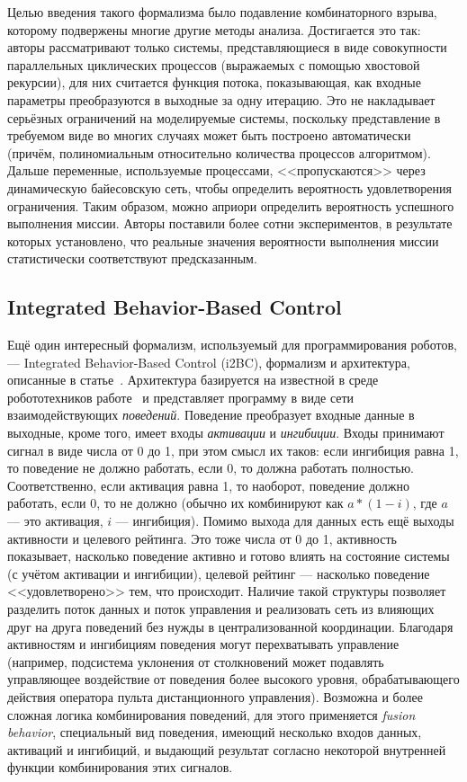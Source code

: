 \documentclass[conference]{IEEEtran}
\begin{document}
Целью введения такого формализма было подавление комбинаторного взрыва, которому 
подвержены многие другие методы анализа. Достигается это так: авторы рассматривают только системы, 
представляющиеся в виде совокупности параллельных циклических процессов 
(выражаемых с помощью хвостовой рекурсии), для них считается функция потока, 
показывающая, как входные параметры преобразуются в выходные за одну итерацию. 
Это не накладывает серьёзных ограничений на моделируемые системы, поскольку 
представление в требуемом виде во многих случаях может быть построено 
автоматически (причём, полиномиальным относительно количества процессов 
алгоритмом). Дальше переменные, используемые процессами, <<пропускаются>> 
через динамическую байесовскую сеть, чтобы определить вероятность удовлетворения 
ограничения. Таким образом, можно априори определить вероятность успешного 
выполнения миссии. Авторы поставили более сотни экспериментов, в результате 
которых установлено, что реальные значения вероятности выполнения миссии 
статистически соответствуют предсказанным.

\subsection{Integrated Behavior-Based Control}
Ещё один интересный формализм, используемый для программирования роботов, --- 
Integrated Behavior-Based Control (i2BC), формализм и архитектура, описанные в 
статье~\cite{proetzsch2007i2bc}. Архитектура базируется на известной в среде 
робототехников работе~\cite{brooks1986layered} и представляет программу в виде 
сети взаимодействующих \textit{поведений}. Поведение преобразует входные данные в 
выходные, кроме того, имеет входы \textit{активации} и \textit{ингибиции}. Входы 
принимают сигнал в виде числа от 0 до 1, при этом смысл их таков: если ингибиция равна 1, то 
поведение не должно работать, если 0, то должна работать полностью. 
Соответственно, если активация равна 1, то наоборот, поведение должно работать, 
если 0, то не должно (обычно их комбинируют как $a * (1 - i)$, где $a$ --- это 
активация, $i$ --- ингибиция). Помимо выхода для данных есть ещё выходы 
активности и целевого рейтинга. Это тоже числа от 0 до 1, активность показывает, 
насколько поведение активно и готово влиять на состояние системы (с учётом 
активации и ингибиции), целевой рейтинг --- насколько поведение <<удовлетворено>> 
тем, что происходит. Наличие такой структуры позволяет разделить поток данных и 
поток управления и реализовать сеть из влияющих друг на друга поведений без 
нужды в централизованной координации. Благодаря активностям и ингибициям 
поведения могут перехватывать управление (например, подсистема уклонения от 
столкновений может подавлять управляющее воздействие от поведения более высокого 
уровня, обрабатывающего действия оператора пульта дистанционного управления). 
Возможна и более сложная логика комбинирования поведений, для этого применяется 
\textit{fusion behavior}, специальный вид поведения, имеющий несколько входов данных, 
активаций и ингибиций, и выдающий результат согласно некоторой внутренней функции 
комбинирования этих сигналов.
\end{document}
